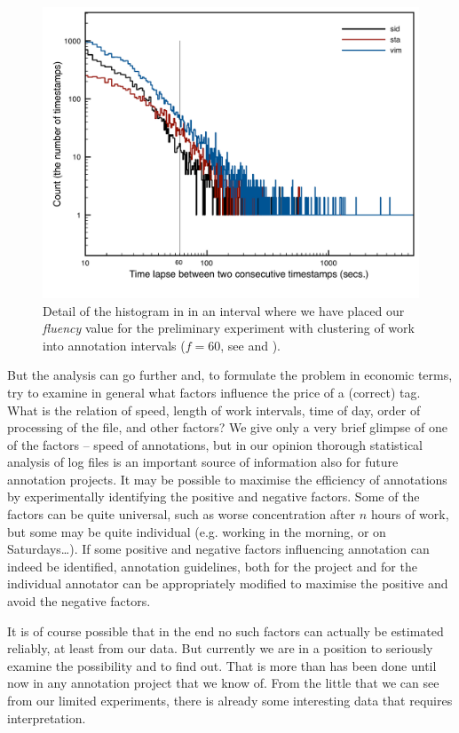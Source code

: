 \begin{figure}[htbp]
   \centering
   \includegraphics[width=.8\textwidth]{images/speed/histograms-detail} 
   \caption{Detail of the histogram in  in an interval where we have placed our \emph{fluency} value for the preliminary experiment with clustering of work into annotation intervals ($f=60$, see  and ).}
\label{fig:hist-detail}
\end{figure}


But the analysis can go further and, to formulate the problem in economic terms, try to examine in general what factors influence the price of a (correct) tag. What is the relation of speed, length of work intervals, time of day, order of processing of the file, and other factors? We give only a very brief glimpse of one of the factors -- speed of annotations, but in our opinion thorough statistical analysis of log files is an important source of information also for future annotation projects. It may be possible to maximise the efficiency of annotations by experimentally identifying the positive and negative factors. Some of the factors can be quite universal, such as worse concentration after $n$ hours of work, but some may be quite individual (e.g. working in the morning, or on Saturdays\ldots). If some positive and negative factors influencing annotation can indeed be identified, annotation guidelines, both for the project and for the individual annotator can be appropriately modified to maximise the positive and avoid the negative factors.

It is of course possible that in the end no such factors can actually be estimated reliably, at least from our data. But currently we are in a position to seriously examine the possibility and to find out. That is more than has been done until now in any annotation project that we know of. From the little that we can see from our limited experiments, there is already some interesting data that requires interpretation.
